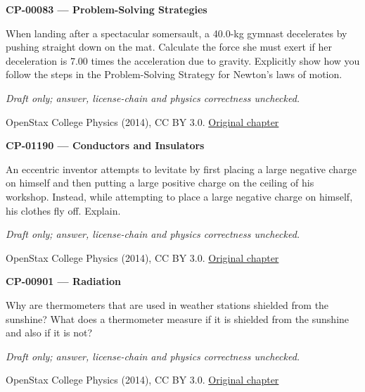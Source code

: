 \par\medskip
\noindent\textbf{CP-00083 — Problem-Solving Strategies}
\par When landing after a spectacular somersault, a 40.0-kg gymnast decelerates by pushing straight down on the mat. Calculate the force she must exert if her deceleration is 7.00 times the acceleration due to gravity. Explicitly show how you follow the steps in the Problem-Solving Strategy for Newton’s laws of motion.
\par\smallskip
\textit{Draft only; answer, license-chain and physics correctness unchecked.}
\par{\footnotesize OpenStax College Physics (2014), CC BY 3.0. \href{https://github.com/philschatz/physics-book/blob/a7efaa7e221fab1694022d8bb98b83a73ee31d3d/contents/m42076.md}{Original chapter}}\par\normalsize

\par\medskip
\noindent\textbf{CP-01190 — Conductors and Insulators}
\par An eccentric inventor attempts to levitate by first placing a large negative charge on himself and then putting a large positive charge on the ceiling of his workshop. Instead, while attempting to place a large negative charge on himself, his clothes fly off. Explain.
\par\smallskip
\textit{Draft only; answer, license-chain and physics correctness unchecked.}
\par{\footnotesize OpenStax College Physics (2014), CC BY 3.0. \href{https://github.com/philschatz/physics-book/blob/a7efaa7e221fab1694022d8bb98b83a73ee31d3d/contents/m42306.md}{Original chapter}}\par\normalsize

\par\medskip
\noindent\textbf{CP-00901 — Radiation}
\par Why are thermometers that are used in weather stations shielded from the sunshine? What does a thermometer measure if it is shielded from the sunshine and also if it is not?
\par\smallskip
\textit{Draft only; answer, license-chain and physics correctness unchecked.}
\par{\footnotesize OpenStax College Physics (2014), CC BY 3.0. \href{https://github.com/philschatz/physics-book/blob/a7efaa7e221fab1694022d8bb98b83a73ee31d3d/contents/m42230.md}{Original chapter}}\par\normalsize

